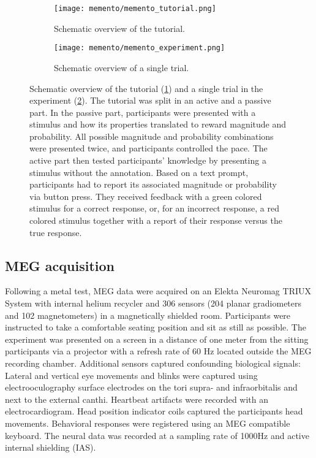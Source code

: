 \begin{figure}
	\begin{subfigure}{.54\textwidth}
	\texttt{[image: memento/memento\_tutorial.png]}
	\caption{Schematic overview of the tutorial.}
	\label{fig:memento_tutorial}
	\end{subfigure}
	\begin{subfigure}{.45\textwidth}
	\texttt{[image: memento/memento\_experiment.png]}
	\caption{Schematic overview of a single trial.}
	\label{fig:memento_trial}
\end{subfigure}
	\caption[Memento: Tutorial and trial overview]{Schematic overview of the tutorial (\ref{fig:memento_tutorial}) and a single trial in the experiment (\ref{fig:memento_trial}).
	The tutorial was split in an active and a passive part.
	In the passive part, participants were presented with a stimulus and how its properties translated to reward magnitude and probability. All possible magnitude and probability combinations were presented twice, and participants controlled the pace. The active part then tested participants' knowledge by presenting a stimulus without the annotation. Based on a text prompt, participants had to report its associated magnitude or probability via button press. They received feedback with a green colored stimulus for a correct response, or, for an incorrect response, a red colored stimulus together with a report of their response versus the true response.
	}
\label{fig:memento}
\end{figure}


\subsection{MEG acquisition}

Following a metal test, MEG data were acquired on an Elekta Neuromag TRIUX System with internal helium recycler and 306 sensors (204 planar gradiometers and 102 magnetometers) in a magnetically shielded room.
Participants were instructed to take a comfortable seating position and sit as still as possible.
The experiment was presented on a screen in a distance of one meter from the sitting participants via a projector with a refresh rate of 60 Hz located outside the MEG recording chamber.
Additional sensors captured confounding biological signals:
Lateral and vertical eye movements and blinks were captured using electrooculography surface electrodes on the tori supra- and infraorbitalis and next to the external canthi.
Heartbeat artifacts were recorded with an electrocardiogram.
Head position indicator coils captured the participants head movements.
Behavioral responses were registered using an MEG compatible keyboard.
The neural data was recorded at a sampling rate of 1000Hz and active internal shielding (IAS).


